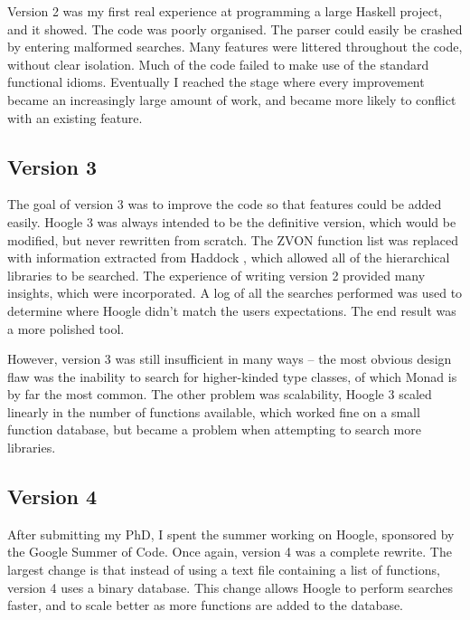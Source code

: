 \documentclass{tmr}
\newcommand{\code}[1]{\textsf{#1}}
\begin{document}
Version 2 was my first real experience at programming a large Haskell project, and it showed. The code was poorly organised. The parser could easily be crashed by entering malformed searches. Many features were littered throughout the code, without clear isolation. Much of the code failed to make use of the standard functional idioms. Eventually I reached the stage where every improvement became an increasingly large amount of work, and became more likely to conflict with an existing feature.

\subsection{Version 3}

The goal of version 3 was to improve the code so that features could be added easily. Hoogle 3 was always intended to be the definitive version, which would be modified, but never rewritten from scratch. The ZVON function list was replaced with information extracted from Haddock \cite{haddock}, which allowed all of the hierarchical libraries to be searched. The experience of writing version 2 provided many insights, which were incorporated. A log of all the searches performed was used to determine where Hoogle didn't match the users expectations. The end result was a more polished tool.

However, version 3 was still insufficient in many ways -- the most obvious design flaw was the inability to search for higher-kinded type classes, of which \code{Monad} is by far the most common. The other problem was scalability, Hoogle 3 scaled linearly in the number of functions available, which worked fine on a small function database, but became a problem when attempting to search more libraries.

\subsection{Version 4}

After submitting my PhD, I spent the summer working on Hoogle, sponsored by the Google Summer of Code. Once again, version 4 was a complete rewrite. The largest change is that instead of using a text file containing a list of functions, version 4 uses a binary database. This change allows Hoogle to perform searches faster, and to scale better as more functions are added to the database.
\end{document}
